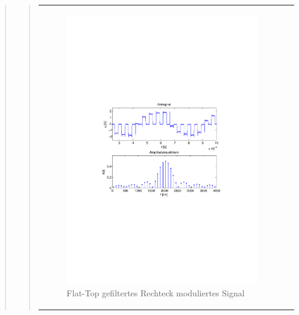 \begin{quote}
\begin{quote}
\begin{center}
\begin{tabular}{ll}
            \hspace{-5cm}
                \begin{minipage}{0.6\textwidth}
                    \begin{figure}[H]
                        \includegraphics[scale=0.7, trim = 35mm 100mm 35mm 95mm, clip]{Bilder/flatrecFil20_05abget_zeit}
                          \caption{Flat-Top gefiltertes Rechteck moduliertes Signal}
		                  \label{fig:flatrecFil20_05zeit}
                    \end{figure}
                \end{minipage}
                

\end{tabular}
\end{center}
\end{quote}
\end{quote}

